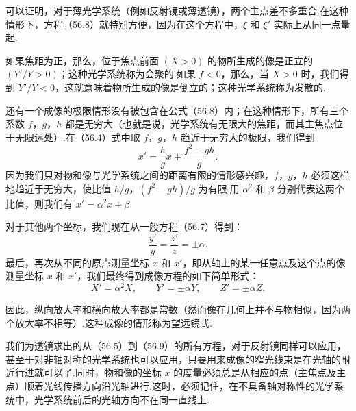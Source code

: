 可以证明，对于薄光学系统（例如反射镜或薄透镜），两个主点差不多重合.在这种情形下，方程（56.8）就特别方便，因为在这个方程中，$\xi$ 和 $\xi'$ 实际上从同一点量起.

如果焦距为正，那么，位于焦点前面 $(X>0)$ 的物所生成的像是正立的 $(Y'/Y>0)$；这种光学系统称为会聚的.如果 $f<0$，那么，当 $X>0$ 时，我们得到 $Y'/Y<0$，这就意味着物所生成的像是倒立的；这种光学系统称为发散的.

还有一个成像的极限情形没有被包含在公式（56.8）内；在这种情形下，所有三个系数 $f$，$g$，$h$ 都是无穷大（也就是说，光学系统有无限大的焦距，而其主焦点位于无限远处）.在（56.4）式中取 $f$，$g$，$h$ 趋近于无穷大的极限，我们得到
\begin{equation*}
  x'=\frac{h}{g}x+\frac{f^2-gh}{g}.
\end{equation*}
因为我们只对物和像与光学系统之间的距离有限的情形感兴趣，$f$，$g$，$h$ 必须这样地趋近于无穷大，使比值 $h/g$，$(f^2-gh)/g$ 为有限.用 $\alpha^2$ 和 $\beta$ 分别代表这两个比值，则我们有 $x'=\alpha^2x+\beta$.

对于其他两个坐标，我们现在从一般方程（56.7）得到：
\begin{equation*}
  \frac{y'}{y}=\frac{z'}{z}=\pm\alpha.
\end{equation*}
最后，再次从不同的原点测量坐标 $x$ 和 $x'$，即从轴上的某一任意点及这个点的像测量坐标 $x$ 和 $x'$，我们最终得到成像方程的如下简单形式：
\begin{equation}
  X'=\alpha^2X,\qquad Y'=\pm\alpha Y,\qquad Z'=\pm\alpha Z.
\end{equation}

因此，纵向放大率和横向放大率都是常数（然而像在几何上并不与物相似，因为两个放大率不相等）.这种成像的情形称为望远镜式.

我们为透镜求出的从（56.5）到（56.9）的所有方程，对于反射镜同样可以应用，甚至于对非轴对称的光学系统也可以应用，只要用来成像的窄光线束是在光轴的附近行进就可以了.同时，物和像的坐标 $x$ 的度量必须总是从相应的点（主焦点及主点）顺着光线传播方向沿光轴进行.这时，必须记住，在不具备轴对称性的光学系统中，光学系统前后的光轴方向不在同一直线上.

